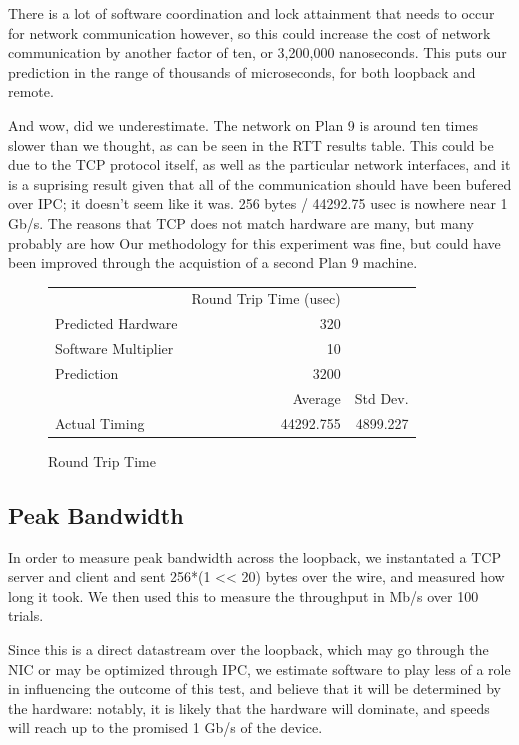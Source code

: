 \documentclass[letterpaper,twocolumn,10pt]{article}
\begin{document}
There is a lot of software coordination and lock attainment that needs to occur for network communication however, so this could increase the cost of network communication by another factor of ten, or 3,200,000 nanoseconds. This puts our prediction in the range of thousands of microseconds, for both loopback and remote.

And wow, did we underestimate. The network on Plan 9 is around ten times slower than we thought, as can be seen in the RTT results table. This could be due to the TCP protocol itself, as well as the particular network interfaces, and it is a suprising result given that all of the communication should have been bufered over IPC; it doesn't seem like it was. 256 bytes / 44292.75 usec is nowhere near 1 Gb/s. The reasons that TCP does not match hardware are many, but many probably are how
Our methodology for this experiment was fine, but could have been improved through the acquistion of a second Plan 9 machine.

\begin{figure}
	\centering
    \begin{tabular}{l r r}
      & Round Trip Time (usec) \\
      Predicted Hardware & 320\\
      Software Multiplier & 10 \\
      Prediction & $3200$ \\
                   & Average & Std Dev.\\
      Actual Timing & 44292.755 & 4899.227 \\
\end{tabular}
\caption{Round Trip Time}
\label{tab:roundtrip}
\end{figure}
\subsection{Peak Bandwidth}
In order to measure peak bandwidth across the loopback, we instantated a TCP server and client and sent 256*(1 << 20) bytes over the wire, and measured how long it took. We then used this to measure the throughput in Mb/s over 100 trials.

Since this is a direct datastream over the loopback, which may go through the NIC or may be optimized through IPC, we estimate software to play less of a role in influencing the outcome of this test, and believe that it will be determined by the hardware: notably, it is likely that the hardware will dominate, and speeds will reach up to the promised 1 Gb/s of the device.
\end{document}
